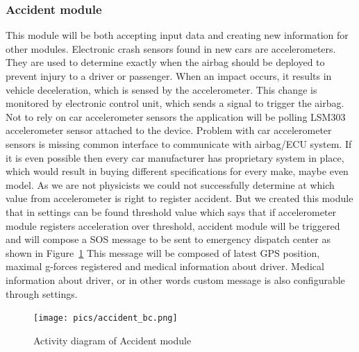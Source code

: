 \subsubsection{Accident module} %
\label{ssub:accident_module}
This module will be both accepting input data and creating new information for other modules. Electronic crash sensors found in new cars are accelerometers. They are used to determine exactly when the airbag should be deployed to prevent injury to a driver or passenger. When an impact occurs, it results in vehicle deceleration, which is sensed by the accelerometer. This change is monitored by electronic control unit, which sends a signal to trigger the airbag. Not to rely on car accelerometer sensors the application will be polling LSM303 accelerometer sensor attached to the device. Problem with car accelerometer sensors is missing common interface to communicate with airbag/ECU system. If it is even possible then every car manufacturer has proprietary system in place, which would result in buying different specifications for every make, maybe even model. As we are not physicists we could not successfully determine at which value from accelerometer is right to register accident. But we created this module that in settings can be found threshold value which says that if accelerometer module registers acceleration over threshold, accident module will be triggered and will compose a SOS message to be sent to emergency dispatch center as shown in Figure~\ref{fig:acc_bc} This message will be composed of latest GPS position, maximal g-forces registered and medical information about driver. Medical information about driver, or in other words custom message is also configurable through settings.
\begin{figure}[H]
\begin{center}
\captionsetup{font=small}
\texttt{[image: pics/accident\_bc.png]}
\caption{Activity diagram of Accident module}
\label{fig:acc_bc}
\end{center}
\end{figure}
